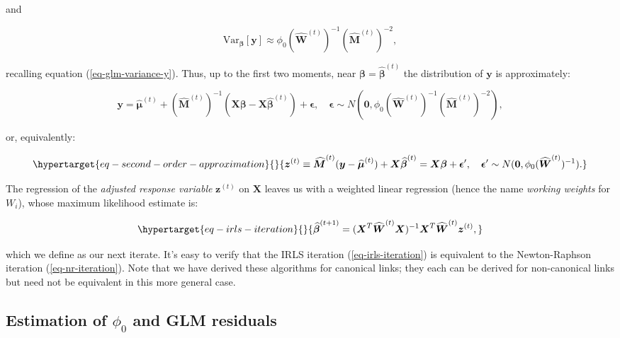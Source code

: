 \documentclass[
  11pt,
  letterpaper,
  oneside]{book}
\theoremstyle{definition}
\theoremstyle{plain}
\theoremstyle{plain}
\theoremstyle{plain}
\theoremstyle{remark}
\begin{document}
and

\[
\text{Var}_{\boldsymbol{\beta}}[\boldsymbol{y}] \approx \phi_0 (\boldsymbol{\widehat W}^{(t)})^{-1}(\boldsymbol{\widehat M}^{(t)})^{-2},
\]

recalling equation (\ref{eq-glm-variance-y}). Thus, up to the first two
moments, near \(\boldsymbol{\beta} = \boldsymbol{\widehat \beta}^{(t)}\)
the distribution of \(\boldsymbol{y}\) is approximately:

\[
\boldsymbol{y} = \boldsymbol{\widehat \mu}^{(t)} + (\boldsymbol{\widehat M}^{(t)})^{-1}(\boldsymbol{X} \boldsymbol{\beta} - \boldsymbol{X} \boldsymbol{\widehat \beta}^{(t)}) + \boldsymbol{\epsilon}, \quad \boldsymbol{\epsilon} \sim N\left(\boldsymbol{0}, \phi_0 (\boldsymbol{\widehat W}^{(t)})^{-1}(\boldsymbol{\widehat M}^{(t)})^{-2}\right),
\]

or, equivalently:

\begin{equation}\protect\hypertarget{eq-second-order-approximation}{}{
\boldsymbol{z}^{(t)} \equiv \boldsymbol{\widehat M}^{(t)}(\boldsymbol{y} - \boldsymbol{\widehat \mu}^{(t)}) + \boldsymbol{X} \boldsymbol{\widehat \beta}^{(t)} = \boldsymbol{X} \boldsymbol{\beta} + \boldsymbol{\epsilon}', \quad \boldsymbol{\epsilon}' \sim N(\boldsymbol{0}, \phi_0 (\boldsymbol{\widehat W}^{(t)})^{-1}).
}\label{eq-second-order-approximation}\end{equation}

The regression of the \emph{adjusted response variable}
\(\boldsymbol{z}^{(t)}\) on \(\boldsymbol{X}\) leaves us with a weighted
linear regression (hence the name \emph{working weights} for \(W_i\)),
whose maximum likelihood estimate is:

\begin{equation}\protect\hypertarget{eq-irls-iteration}{}{
\boldsymbol{\widehat \beta}^{(t+1)} = (\boldsymbol{X}^T \boldsymbol{\widehat W}^{(t)} \boldsymbol{X})^{-1} \boldsymbol{X}^T \boldsymbol{\widehat W}^{(t)} \boldsymbol{z}^{(t)},
}\label{eq-irls-iteration}\end{equation}

which we define as our next iterate. It's easy to verify that the IRLS
iteration (\ref{eq-irls-iteration}) is equivalent to the Newton-Raphson
iteration (\ref{eq-nr-iteration}). Note that we have derived these
algorithms for canonical links; they each can be derived for
non-canonical links but need not be equivalent in this more general
case.

\hypertarget{sec-glm-residuals}{%
\subsection{\texorpdfstring{Estimation of \(\phi_0\) and GLM
residuals}{Estimation of \textbackslash phi\_0 and GLM residuals}}\label{sec-glm-residuals}}
\end{document}

